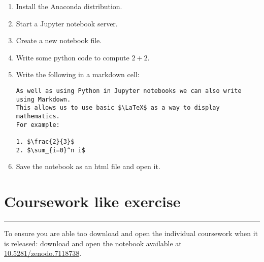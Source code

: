\documentclass{article}
\begin{document}
\begin{enumerate}
\item
  Install the Anaconda distribution.
\item
  Start a Jupyter notebook server.
\item
  Create a new notebook file.
\item
  Write some python code to compute \(2 + 2\).
\item
  Write the following in a markdown cell:


\begin{verbatim}
As well as using Python in Jupyter notebooks we can also write using Markdown.
This allows us to use basic $\LaTeX$ as a way to display mathematics.
For example:

1. $\frac{2}{3}$
2. $\sum_{i=0}^n i$
\end{verbatim}

\item Save the notebook as an html file and open it.
\end{enumerate}


\section{Coursework like exercise}
\hrule

To ensure you are able too download and open the individual coursework when it
is released: download and open the notebook available at
\href{https://zenodo.org/record/7118738/files/demo.ipynb?download=1}{10.5281/zenodo.7118738}.
\end{document}
